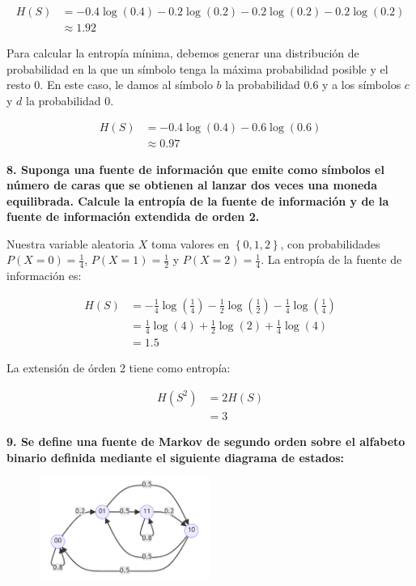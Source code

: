 \documentclass{article}
\begin{document}
\begin{align*}
    H(S) &= -0.4\log(0.4) - 0.2\log(0.2) - 0.2\log(0.2) - 0.2\log(0.2)\\
    &\approx 1.92
\end{align*}

Para calcular la entropía mínima, debemos generar una distribución de probabilidad en la que un símbolo tenga la máxima probabilidad posible y el resto $0$. En este caso, le damos al símbolo $b$ la probabilidad $0.6$ y a los símbolos $c$ y $d$ la probabilidad $0$.

\begin{align*}
    H(S) &= -0.4\log(0.4) - 0.6\log(0.6)\\
    &\approx 0.97
\end{align*}

\textbf{
8. Suponga una fuente de información que emite como símbolos el número de caras que se obtienen al lanzar dos veces una moneda equilibrada. Calcule la entropía de la fuente de información y de la fuente de información extendida de orden 2.
}

\vspace{0.5cm}

Nuestra variable aleatoria $X$ toma valores en $\left\{0,1,2\right\}$, con probabilidades $P(X=0) = \frac{1}{4}$, $P(X=1) = \frac{1}{2}$ y $P(X=2) = \frac{1}{4}$. La entropía de la fuente de información es:

\begin{align*}
    H(S) &= -\frac{1}{4}\log\left(\frac{1}{4}\right) - \frac{1}{2}\log\left(\frac{1}{2}\right) - \frac{1}{4}\log\left(\frac{1}{4}\right)\\
    &= \frac{1}{4}\log(4) + \frac{1}{2}\log(2) + \frac{1}{4}\log(4)\\
    &= 1.5
\end{align*}

La extensión de órden 2 tiene como entropía:

\begin{align*}
    H(S^2) &= 2H(S)\\
    &= 3
\end{align*}

\vspace{1cm}

\textbf{
9. Se define una fuente de Markov de segundo orden sobre el alfabeto binario definida mediante el siguiente diagrama de estados:
}

\begin{figure}[htbp!]
    \centering
    \includegraphics[width=0.5\textwidth]{./entropia_y_fuentes/img/mermaid1.png}
\end{figure}
\end{document}
